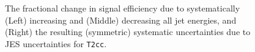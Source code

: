 \begin{figure}[h!]
\begin{center}
{    }
    \\
    \\
    \caption{\label{fig:sms-jes-t2cc}The fractional change in
      signal efficiency due to systematically (Left) increasing and
      (Middle) decreasing all jet energies, and (Right) the resulting
      (symmetric) systematic uncertainties due to JES uncertainties
      for \texttt{T2cc}.}
  \end{center}
\end{figure}

